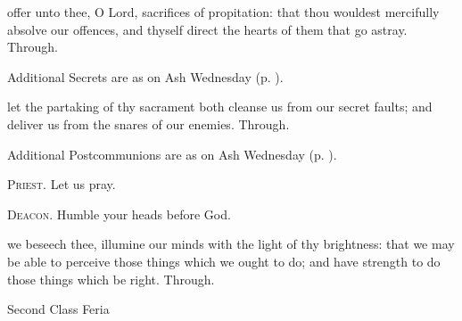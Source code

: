 \secret
{} offer unto thee, O Lord, sacrifices of propitation: that thou wouldest mercifully absolve our offences, and thyself direct the hearts of them that go astray. Through.
\begin{rubric}
    Additional Secrets are as on Ash Wednesday (p. \pageref{AshWednesdayMassSecret}).
\end{rubric}
\postcommunion
{} let the partaking of thy sacrament both cleanse us from our secret faults; and deliver us from the snares of our enemies. Through.

\begin{rubric}
    Additional Postcommunions are as on Ash Wednesday (p. \pageref{AshWednesdayMassPostcommunion}).
\end{rubric}

\textsc{Priest.} Let us pray.\par
\textsc{Deacon.} Humble your heads before God.\par
{} we beseech thee, illumine our minds with the light of thy brightness: that we may be able to perceive those things which we ought to do; and have strength to do those things which be right. Through.


\begin{inhead}
{Second Class Feria}
\end{inhead}
\par\noindent
{}


\properantiphonfix

